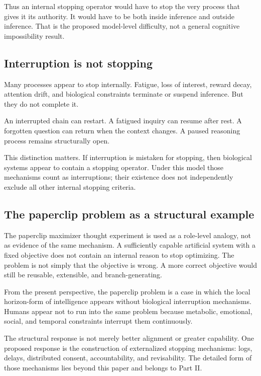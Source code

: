 Thus an internal stopping operator would have to stop the very process that gives it its authority. It would have to be both inside inference and outside inference. That is the proposed model-level difficulty, not a general cognitive impossibility result.

\subsection{Interruption is not stopping}

Many processes appear to stop internally. Fatigue, loss of interest, reward decay, attention drift, and biological constraints terminate or suspend inference. But they do not complete it.

An interrupted chain can restart. A fatigued inquiry can resume after rest. A forgotten question can return when the context changes. A paused reasoning process remains structurally open.

This distinction matters. If interruption is mistaken for stopping, then biological systems appear to contain a stopping operator. Under this model those mechanisms count as interruptions; their existence does not independently exclude all other internal stopping criteria.

\subsection{The paperclip problem as a structural example}

The paperclip maximizer thought experiment is used as a role-level analogy, not as evidence of the same mechanism. A sufficiently capable artificial system with a fixed objective does not contain an internal reason to stop optimizing. The problem is not simply that the objective is wrong. A more correct objective would still be reusable, extensible, and branch-generating.

From the present perspective, the paperclip problem is a case in which the local horizon-form of intelligence appears without biological interruption mechanisms. Humans appear not to run into the same problem because metabolic, emotional, social, and temporal constraints interrupt them continuously.

The structural response is not merely better alignment or greater capability. One proposed response is the construction of externalized stopping mechanisms: logs, delays, distributed consent, accountability, and revisability. The detailed form of those mechanisms lies beyond this paper and belongs to Part II.

